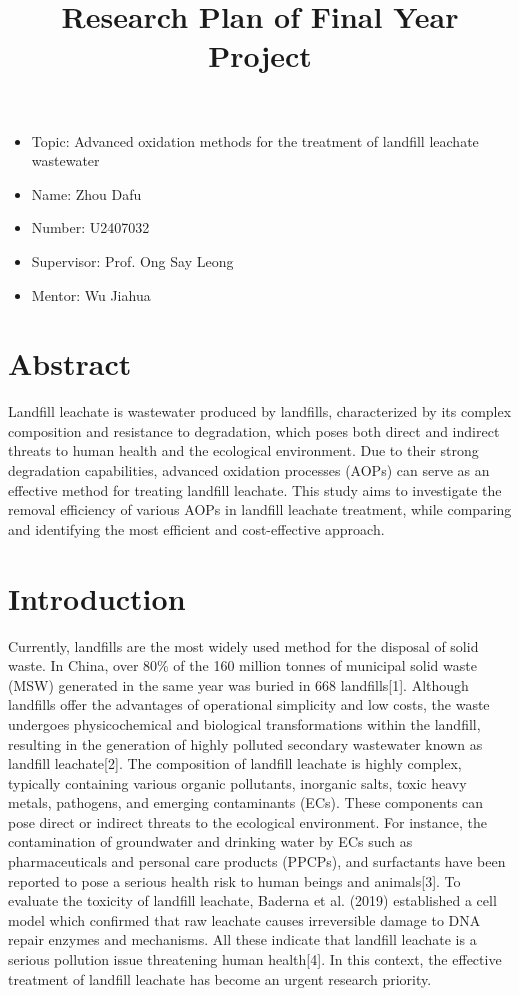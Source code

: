 \documentclass[a4paper]{article}
\title{Research Plan of Final Year Project}
\date{}
\begin{document}
\maketitle
\begin{itemize}
    \item{Topic: Advanced oxidation methods for the treatment of landfill leachate wastewater}
    \item{Name: Zhou Dafu}
    \item{Number: U2407032}
    \item{Supervisor: Prof. Ong Say Leong}
    \item{Mentor: Wu Jiahua}
\end{itemize}

\section*{Abstract}

Landfill leachate is wastewater produced by landfills, characterized by its complex composition and resistance to degradation, which poses both direct and indirect threats to human health and the ecological environment. Due to their strong degradation capabilities, advanced oxidation processes (AOPs) can serve as an effective method for treating landfill leachate. This study aims to investigate the removal efficiency of various AOPs in landfill leachate treatment, while comparing and identifying the most efficient and cost-effective approach.

\section{Introduction}

Currently, landfills are the most widely used method for the disposal of solid waste. In China, over 80\% of the 160 million tonnes of municipal solid waste (MSW) generated in the same year was buried in 668 landfills{[}1{]}. Although landfills offer the advantages of operational simplicity and low costs, the waste undergoes physicochemical and biological transformations within the landfill, resulting in the generation of highly polluted secondary wastewater known as landfill leachate{[}2{]}. The composition of landfill leachate is highly complex, typically containing various organic pollutants, inorganic salts, toxic heavy metals, pathogens, and emerging contaminants (ECs). These components can pose direct or indirect threats to the ecological environment. For instance, the contamination of groundwater and drinking water by ECs such as pharmaceuticals and personal care products (PPCPs), and surfactants have been reported to pose a serious health risk to human beings and animals{[}3{]}. To evaluate the toxicity of landfill leachate, Baderna et al. (2019) established a cell model which confirmed that raw leachate causes irreversible damage to DNA repair enzymes and mechanisms. All these indicate that landfill leachate is a serious pollution issue threatening human health{[}4{]}. In this context, the effective treatment of landfill leachate has become an urgent research priority.
\end{document}
